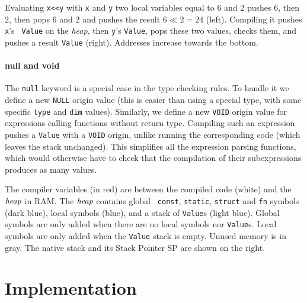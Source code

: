 \begin{Figure}
  

  \caption{Evaluating {\tt x{<}{<}y} with {\tt x} and {\tt y} two local
  variables equal to $6$ and $2$ pushes $6$, then $2$, then pops $6$ and $2$
  and pushes the result $6\ll 2=24$ (left). Compiling it pushes {\tt x}'s {\tt
  Value} on the {\em heap}, then {\tt y}'s {\tt Value}, pops these two values,
  checks them, and pushes a result {\tt Value} (right). Addresses increase
  towards the bottom.}\label{fig:value-stack}
\end{Figure}

\paragraph*{null and void} The {\tt null} keyword is a special case in the type
checking rules. To handle it we define a new {\tt NULL} origin value (this is
easier than using a special type, with some specific {\tt type} and {\tt dim}
values). Similarly, we define a new {\tt VOID} origin value for expressions
calling functions without return type. Compiling such an expression pushes a
{\tt Value} with a {\tt VOID} origin, unlike running the corresponding code
(which leaves the stack unchanged). This simplifies all the expression parsing
functions, which would otherwise have to check that the compilation of their
subexpressions produces as many values.

\begin{Figure}
  

  \caption{The compiler variables (in red) are between the compiled code
  (white) and the $\it{heap}$ in RAM. The $\it{heap}$ contains global {\tt
  const}, {\tt static}, {\tt struct} and {\tt fn} symbols (dark blue), local
  symbols (blue), and a stack of {\tt Value}s (light blue). Global symbols are
  only added when there are no local symbols nor {\tt Value}s. Local symbols
  are only added when the {\tt Value} stack is empty. Unused memory is in gray.
  The native stack and its Stack Pointer SP are shown on the
  right.}\label{fig:toyc-memory-map}
\end{Figure}

\section{Implementation}


